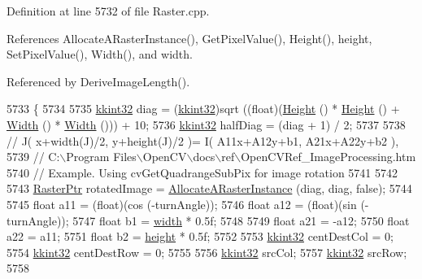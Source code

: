 Definition at line 5732 of file Raster.\+cpp.



References Allocate\+A\+Raster\+Instance(), Get\+Pixel\+Value(), Height(), height, Set\+Pixel\+Value(), Width(), and width.



Referenced by Derive\+Image\+Length().


\begin{DoxyCode}
5733 \{
5734 
5735   \hyperlink{namespace_k_k_b_a8fa4952cc84fda1de4bec1fbdd8d5b1b}{kkint32}  diag = (\hyperlink{namespace_k_k_b_a8fa4952cc84fda1de4bec1fbdd8d5b1b}{kkint32})sqrt ((\textcolor{keywordtype}{float})(\hyperlink{class_k_k_b_1_1_raster_af8d10d15697d5b92fb9595c48b529feb}{Height} () * \hyperlink{class_k_k_b_1_1_raster_af8d10d15697d5b92fb9595c48b529feb}{Height} () + 
      \hyperlink{class_k_k_b_1_1_raster_aa2780c0b7ae75b7b595f99329689c1f6}{Width} () * \hyperlink{class_k_k_b_1_1_raster_aa2780c0b7ae75b7b595f99329689c1f6}{Width} ())) + 10;
5736   \hyperlink{namespace_k_k_b_a8fa4952cc84fda1de4bec1fbdd8d5b1b}{kkint32}  halfDiag = (diag + 1) / 2;
5737 
5738   \textcolor{comment}{//  J( x+width(J)/2, y+height(J)/2 )= I( A11x+A12y+b1, A21x+A22y+b2 ),}
5739   \textcolor{comment}{//  C:\(\backslash\)Program Files\(\backslash\)OpenCV\(\backslash\)docs\(\backslash\)ref\(\backslash\)OpenCVRef\_ImageProcessing.htm}
5740   \textcolor{comment}{//      Example. Using cvGetQuadrangeSubPix for image rotation}
5741 
5742 
5743   \hyperlink{class_k_k_b_1_1_raster}{RasterPtr}  rotatedImage = \hyperlink{class_k_k_b_1_1_raster_aa879980d112c01cb7ad9a3cfc7cd6f64}{AllocateARasterInstance} (diag, diag, \textcolor{keyword}{false});
5744 
5745   \textcolor{keywordtype}{float}  a11 = (float)(cos (-turnAngle));
5746   \textcolor{keywordtype}{float}  a12 = (float)(sin (-turnAngle));
5747   \textcolor{keywordtype}{float}  b1  = \hyperlink{class_k_k_b_1_1_raster_ae0bcc103e191c3421d7692dc69ceb554}{width}  * 0.5f;
5748 
5749   \textcolor{keywordtype}{float}  a21 = -a12;
5750   \textcolor{keywordtype}{float}  a22 = a11;
5751   \textcolor{keywordtype}{float}  b2  = \hyperlink{class_k_k_b_1_1_raster_af39ff189de4fbb6de98392e187efafb7}{height} * 0.5f;
5752 
5753   \hyperlink{namespace_k_k_b_a8fa4952cc84fda1de4bec1fbdd8d5b1b}{kkint32}  centDestCol = 0;
5754   \hyperlink{namespace_k_k_b_a8fa4952cc84fda1de4bec1fbdd8d5b1b}{kkint32}  centDestRow = 0;
5755 
5756   \hyperlink{namespace_k_k_b_a8fa4952cc84fda1de4bec1fbdd8d5b1b}{kkint32}  srcCol;
5757   \hyperlink{namespace_k_k_b_a8fa4952cc84fda1de4bec1fbdd8d5b1b}{kkint32}  srcRow;
5758 

\end{DoxyCode}
